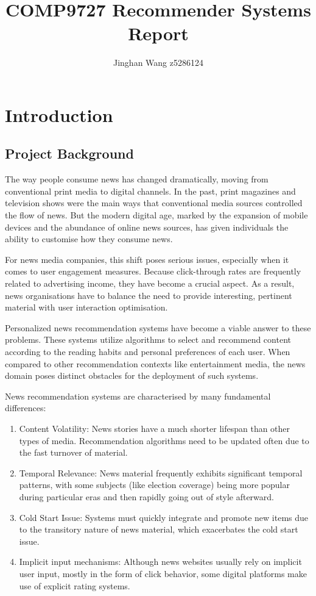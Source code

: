 \documentclass[9pt,twocolumn,twoside,lineno]{gsajnl}
\title{COMP9727 Recommender Systems Report}
\author[1]{Jinghan Wang  z5286124}
\begin{document}
\maketitle
\thispagestyle{firststyle}
\vspace{-13pt}%

\section{Introduction}
\subsection{Project Background}
The way people consume news has changed dramatically, moving from conventional print media to digital channels. In the past, print magazines and television shows were the main ways that conventional media sources controlled the flow of news. But the modern digital age, marked by the expansion of mobile devices and the abundance of online news sources, has given individuals the ability to customise how they consume news.

For news media companies, this shift poses serious issues, especially when it comes to user engagement measures. Because click-through rates are frequently related to advertising income, they have become a crucial aspect. As a result, news organisations have to balance the need to provide interesting, pertinent material with user interaction optimisation.

Personalized news recommendation systems have become a viable answer to these problems. These systems utilize algorithms to select and recommend content according to the reading habits and personal preferences of each user. When compared to other recommendation contexts like entertainment media, the news domain poses distinct obstacles for the deployment of such systems.

News recommendation systems are characterised by many fundamental differences:

\begin{enumerate}
\item Content Volatility: News stories have a much shorter lifespan than other types of media. Recommendation algorithms need to be updated often due to the fast turnover of material.
\item Temporal Relevance: News material frequently exhibits significant temporal patterns, with some subjects (like election coverage) being more popular during particular eras and then rapidly going out of style afterward.
\item Cold Start Issue: Systems must quickly integrate and promote new items due to the transitory nature of news material, which exacerbates the cold start issue.
\item Implicit input mechanisms: Although news websites usually rely on implicit user input, mostly in the form of click behavior, some digital platforms make use of explicit rating systems.
\end{enumerate}
\end{document}
